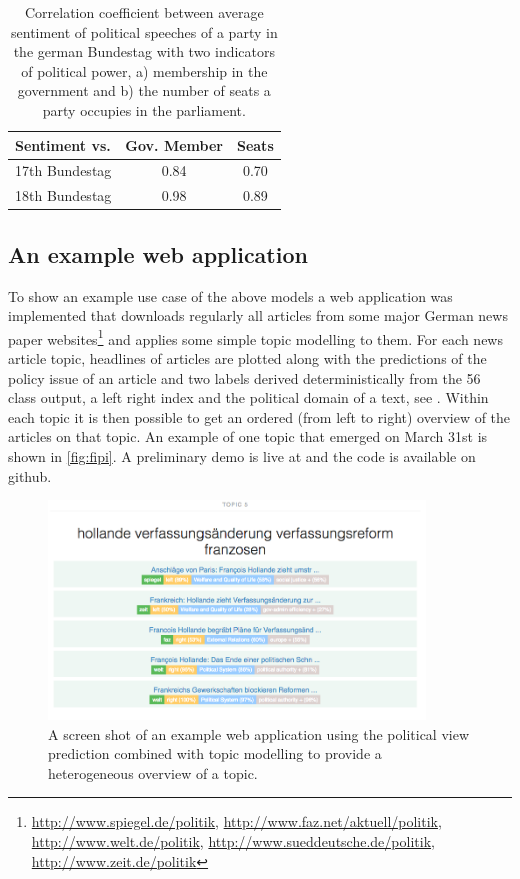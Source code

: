 \documentclass{article}
\begin{document}
\begin{table}[t]
\caption{
\label{tab:sentiments}
Correlation coefficient between average sentiment of political speeches of a party in the german Bundestag with two indicators of political power, a) membership in the government and b) the number of seats a party occupies in the parliament.
}
\begin{center}
\begin{tabular}{lcc}
   Sentiment vs. &          Gov. Member    &  Seats\\
\hline\hline
17th Bundestag    &  0.84 & 0.70\\
18th Bundestag   &  0.98 & 0.89\\
%
\end{tabular}
\end{center}
\end{table}




\subsection{An example web application}
To show an example use case of the above models a web application was implemented that downloads regularly all articles from some major German news paper websites\footnote{\url{http://www.spiegel.de/politik}, \url{http://www.faz.net/aktuell/politik}, \url{http://www.welt.de/politik}, \url{http://www.sueddeutsche.de/politik}, \url{http://www.zeit.de/politik}} and applies some simple topic modelling to them. For each news article topic, headlines of articles are plotted along with the predictions of the policy issue of an article and two labels derived deterministically from the 56 class output, a left right index and the political domain of a text, see \cite{leftright}. Within each topic it is then possible to get an ordered (from left to right) overview of the articles on that topic. An example of one topic that emerged on March 31st is shown in \autoref{fig:fipi}. A preliminary demo is live at \cite{fipidemo} and the code is available on github\cite{fipi}.
\begin{figure}
\begin{center}
\includegraphics[width=10cm]{images/fipi-screenshot}
%
\end{center}
\caption{
\label{fig:fipi}
A screen shot of an example web application using the political view prediction combined with topic modelling to provide a heterogeneous overview of a topic. }
\end{figure}
\end{document}
